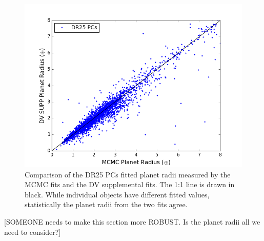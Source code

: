 \begin{figure}
\centering
\includegraphics[width=0.99\linewidth]{fig-comparePradius-mcmcSup.png}
\caption{Comparison of the DR25 PCs fitted planet radii measured by the MCMC fits and the DV supplemental fits. The 1:1 line is drawn in black. While individual objects have different fitted values, statistically the planet radii from the two fits agree. }
\label{f:mcmcsupp}
\end{figure}


[SOMEONE needs to make this section more ROBUST. Is the planet radii all we need to consider?]
